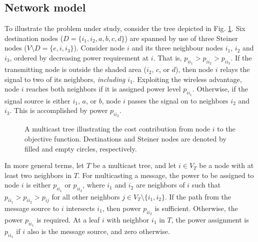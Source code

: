 \subsection{Network model} \label{sec:netmod}

To illustrate the problem under study, consider the tree depicted in Fig. \ref{fig:objexp}.
Six destination nodes ($D=\{i_1,i_2,a,b,c,d\}$) are spanned by use of three Steiner nodes ($V\setminus D = \{e,i,i_3\}$).
Consider node $i$ and its three neighbour nodes $i_1$, $i_2$ and $i_3$, ordered by decreasing power requirement at $i$.
That is, $p_{ii_1}>p_{ii_2}>p_{ii_3}$.
If the transmitting node is outside the shaded area ($i_2$, $c$, or $d$), then node $i$ relays the signal to two of its neighbors, \emph{including $i_1$}.
Exploiting the wireless advantage, node $i$ reaches both neighbors if it is assigned power level $p_{ii_1}$.
Otherwise, if the signal source is either $i_1$, $a$, or $b$, node $i$ passes the signal on to neighbors $i_2$ and $i_3$.
This is accomplished by power $p_{ii_2}$.

\begin{figure}[h!]
\centering
{}
\caption{A multicast tree illustrating the cost contribution from node $i$ to the objective function.
	 Destinations and Steiner nodes are denoted by filled and empty circles, respectively.}
\label{fig:objexp}
\end{figure}

In more general terms, let $T$ be a multicast tree, and let $i\in V_T$ be a node with at least two neighbors in $T$.
For multicasting a message, the power to be assigned to node $i$ is either $p_{ii_1}$ or $p_{ii_2}$, where $i_1$ and $i_2$ are neighbors of $i$ such that
$p_{ii_1}>p_{ii_2}>p_{ij}$ for all other neighbors $j\in V_T\setminus\{i_1,i_2\}$.
If the path from the message source to $i$ intersects $i_1$, then power $p_{ii_2}$ is sufficient.
Otherwise, the power $p_{ii_1}$ is required.
At a leaf $i$ with neighbor $i_1$ in $T$, the power assignment is $p_{ii_1}$ if $i$ also is the message source, and zero otherwise.

